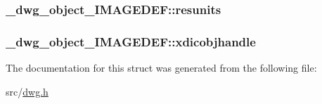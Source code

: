 \hypertarget{struct__dwg__object__IMAGEDEF_acdf026b62256b61b9c133b68221f6597}{
\subsubsection[{resunits}]{ {\bf \-\_\-dwg\-\_\-object\-\_\-\-I\-M\-A\-G\-E\-D\-E\-F\-::resunits}}}\label{struct__dwg__object__IMAGEDEF_acdf026b62256b61b9c133b68221f6597}
\hypertarget{struct__dwg__object__IMAGEDEF_adcb94007de1e1bd035f19fb7a674af68}{
\subsubsection[{xdicobjhandle}]{ {\bf \-\_\-dwg\-\_\-object\-\_\-\-I\-M\-A\-G\-E\-D\-E\-F\-::xdicobjhandle}}}\label{struct__dwg__object__IMAGEDEF_adcb94007de1e1bd035f19fb7a674af68}


\-The documentation for this struct was generated from the following file\-:\begin{DoxyCompactItemize}
\item 
src/\hyperlink{dwg_8h}{dwg.\-h}\end{DoxyCompactItemize}
